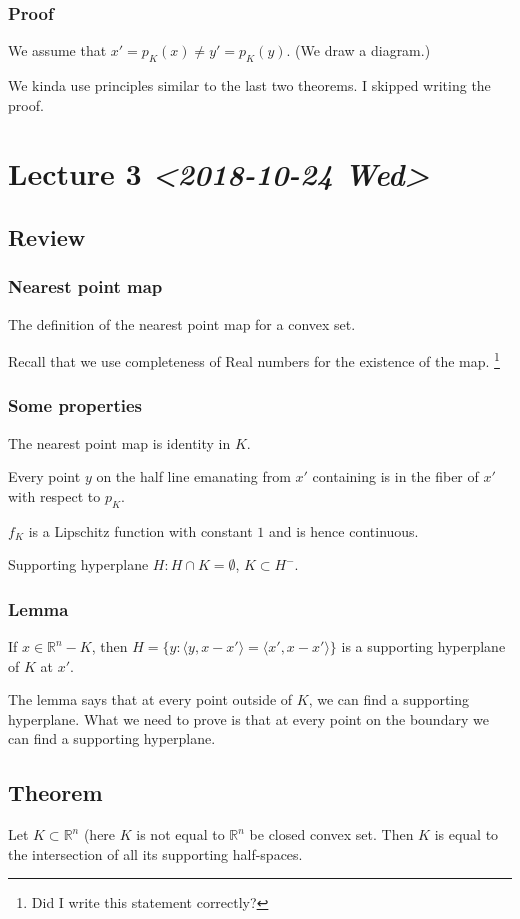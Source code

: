\documentclass[11pt]{article}
\def\R{\mathbb{R}}
\begin{document}
\subsubsection{Proof}
\label{sec:org547585a}
We assume that \(x' = p_K(x) \neq y' = p_K(y)\). (We draw a diagram.)

We kinda use principles similar to the last two theorems. I skipped writing
the proof.
\section{Lecture 3 \textit{<2018-10-24 Wed>}}
\label{sec:org1a8000d}
\subsection{Review}
\label{sec:orga7c5806}
\subsubsection{Nearest point map}
\label{sec:org98034fc}
The definition of the nearest point map for a convex set.

Recall that we use completeness of Real numbers for the existence of the map. \footnote{Did I write this statement correctly?}
\subsubsection{Some properties}
\label{sec:org7285e75}
The nearest point map is identity in \(K\). 

Every point \(y\) on the half line emanating from \(x'\) containing is in the
fiber of \(x'\) with respect to \(p_K\).

\(f_K\) is a Lipschitz function with constant \(1\) and is hence continuous. 

Supporting hyperplane \(H \colon H \cap K = \emptyset\), \(K\subset H^{-}\). 
\subsubsection{Lemma}
\label{sec:orgb6ec985}
If \(x \in \R^n - K\), then \(H=\{y \colon \langle y, x-x'\rangle = \langle x',
    x-x'\rangle \}\) is a supporting hyperplane of \(K\) at \(x'\).

The lemma says that at every point outside of \(K\), we can find a supporting
hyperplane. What we need to prove is that at every point on the boundary we
can find a supporting hyperplane. 
\subsection{Theorem}
\label{sec:orga26491e}
Let \(K\subset \R^n\) (here \(K\) is not equal to \(\R^n\) be closed convex set.
Then \(K\) is equal to the intersection of all its supporting half-spaces. 
\end{document}
